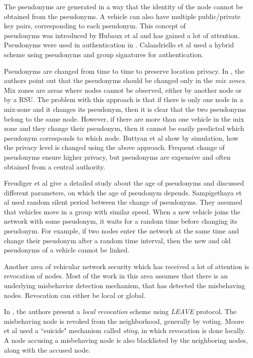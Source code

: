 \documentclass[conference]{IEEEtran}[10pt]
\begin{document}
The pseudonyms are generated in a way that the identity of the node cannot be obtained from the pseudonyms. 
A vehicle can also have multiple public/private key pairs, corresponding to each pseudonym. 
This concept of \\pseudonyms was introduced by Hubaux et al \cite{HCL04} and has gained a lot of attention.  
Pseudonyms were used in authentication in \cite{RH07}.
Calandriello et al \cite{CPHL07} used a hybrid scheme using pseudonyms and group signatures for authentication. 


Pseudonyms are changed from time to time to preserve location privacy. 
In \cite{FRFPH07}, the authors point out that the pseudonyms should be changed only in the \emph{mix zones}.
Mix zones are areas where nodes  cannot be observed, either
by another node or by a RSU. 
The problem with this approach is that if there is only one node
in a mix-zone and it changes its pseudonym, then it is clear that the two pseudonyms belong to the same node. 
However, if there are more than one vehicle in the mix zone and they change their pseudonym, 
then it cannot be easily predicted which pseudonym corresponds to which node. 
Buttyan et al \cite{BHV07} show by simulation, how the privacy level is changed using the above approach. 
Frequent change of pseudonyms ensure higher privacy, but pseudonyms are expensive and often obtained from
a central authority. 

Freudiger et al \cite{FMBH10} give a detailed study about the age of pseudonyms and discussed different parameters, on which
the age of pseudonym depends. 
Sampigethaya et al \cite{SHLPM05,SLHP07} used random silent period between the change of pseudonyms. 
They assumed that vehicles move in a group with similar speed. When a new vehicle joins the network with some pseudonym, 
it waits for a random time before changing its pseudonym. 
For example, if two nodes enter the network
at the same time and change their pseudonym after a random time interval, then the new and old pseudonyms of a vehicle cannot be linked. 

Another area of vehicular network security which has received a lot of attention is revocation of nodes. 
Most of the work in this area assumes that there is an underlying misbehavior detection mechanism, 
that has detected the misbehaving nodes. 
Revocation can either be local or global.
 
In \cite{RPAJH07}, the authors present a \emph{local revocation} scheme using \emph{LEAVE} protocol. 
The misbehaving node is revoked from the neighborhood, generally by voting. 
Moore et al \cite{MRCPAH08} used a ``suicide" mechanism called \emph{sting}, in which revocation is done locally. 
A node accusing a misbehaving node is also blacklisted by the neighboring nodes, along with the accused node. 
\end{document}

